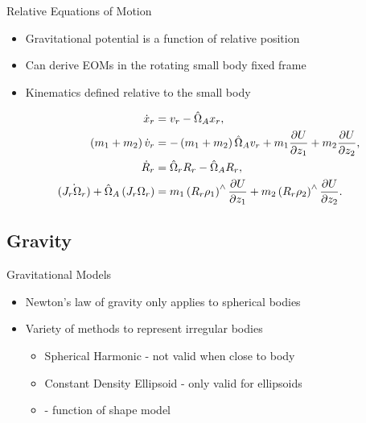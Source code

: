 \begin{frame}{Relative Equations of Motion}

\begin{itemize}
    \item Gravitational potential is a function of relative position
    \item Can derive EOMs in the rotating small body fixed frame
    \item Kinematics defined relative to the small body
\end{itemize}

\begin{align*}
    \dot{x}_r &= v_r - \hat{\Omega}_A x_r, \\
    \left( m_1 + m_2 \right) \dot{v}_r  &= -\left( m_1 + m_2 \right) \hat{\Omega}_A v_r + m_1 \frac{\partial U}{\partial z_1} + m_2 \frac{\partial U}{\partial z_2}, \\
    \dot{R}_r &= \hat{\Omega}_r R_r  - \hat{\Omega}_A R_r , \\
    \dot{\left( J_r  \Omega_r \right)} + \hat{\Omega}_A \left( J_r  \Omega_r \right) &= m_1 \left( R_r  \rho_1 \right)^\wedge \frac{\partial U}{\partial z_1} + m_2 \left( R_r  \rho_2 \right)^\wedge \frac{\partial U}{\partial z_2}.
\end{align*}
\end{frame}

\subsection{Gravity}

\begin{frame}{Gravitational Models}
    \begin{center}
        
    \end{center}

    \begin{itemize}
        \item Newton's law of gravity only applies to spherical bodies
        \item Variety of methods to represent irregular bodies
            \begin{itemize}
                \item Spherical Harmonic - not valid when close to body
                \item Constant Density Ellipsoid - only valid for ellipsoids
                \item {} - function of shape model
            \end{itemize}
    \end{itemize}
\end{frame}

